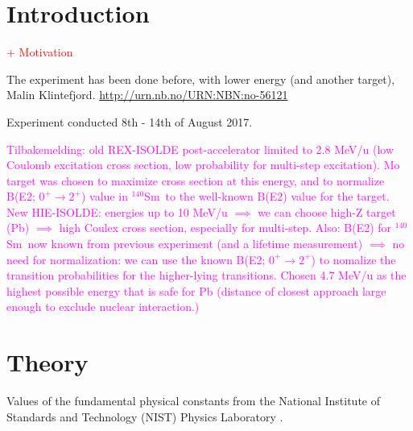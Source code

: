 \documentclass[twoside,english]{uiofysmaster/uiofysmaster}
\newcommand{\Sm}{$^{140}$Sm} %
\begin{document}

\chapter{Introduction}
\textcolor{red}{+ Motivation}


The experiment has been done before, with lower energy (and another target), Malin Klintefjord. \url{http://urn.nb.no/URN:NBN:no-56121} \newline
 
 
Experiment conducted 8th - 14th of August 2017.

\bigskip

\textcolor{Magenta}{Tilbakemelding: \newline 
old REX-ISOLDE post-accelerator limited to 2.8 MeV/u (low Coulomb excitation cross section, low probability for multi-step excitation). Mo target was chosen to maximize cross section at this energy, and to normalize B(E2; $0^+ \rightarrow 2^+$) value in \Sm\ to the well-known B(E2) value for the target. \newline
New HIE-ISOLDE: energies up to 10 MeV/u $\implies$ we can choose high-Z target (Pb) $\implies$ high Coulex cross section, especially for multi-step. Also: B(E2) for \Sm\ now known from previous experiment (and a lifetime measurement) $\implies$ no need for normalization: we can use the known B(E2; $0^+ \rightarrow 2^+$) to nomalize the transition probabilities for the higher-lying transitions. Chosen 4.7 MeV/u as the highest possible energy that is safe for Pb (distance of closest approach large enough to exclude nuclear interaction.)}



\chapter{Theory}


\begin{table}[ht] 
    \centering 
    \caption{Values of the fundamental physical constants from the National Institute of Standards and Technology (NIST) Physics Laboratory \cite{units}.}
	
	\label{tab:units}
\end{table}
\end{document}
